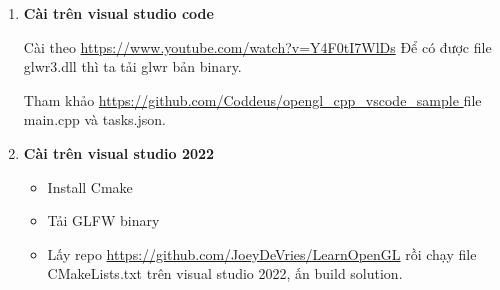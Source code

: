 \begin{enumerate}
    \item 
\textbf{Cài trên visual studio code}


Cài theo \url{https://www.youtube.com/watch?v=Y4F0tI7WlDs} 
Để có được file glwr3.dll thì ta tải glwr bản binary.

Tham khảo \url{ https://github.com/Coddeus/opengl_cpp_vscode_sample }
file main.cpp và tasks.json.

\item
\textbf{Cài trên visual studio 2022}
\begin{itemize}
    \item Install Cmake
    \item Tải GLFW binary
    \item Lấy repo \url {https://github.com/JoeyDeVries/LearnOpenGL}
    rồi chạy file CMakeLists.txt trên visual studio 2022, 
    ấn build solution.
\end{itemize}
\end{enumerate}


